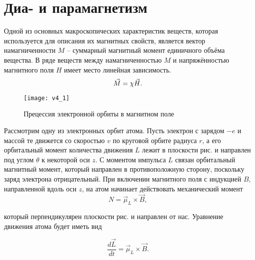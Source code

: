 \section{Диа- и парамагнетизм}

Одной из основных макроскопических характеристик веществ, которая используется для описания их магнитных свойств, является вектор намагниченности $M$ -- суммарный магнитный момент единичного объёма вещества. В ряде веществ между намагниченностью $M$ и напряжённостью магнитного поля $H$ имеет место линейная зависимость.
\begin{equation}
	\eqmark{magnetization-magnetic vector}
	\vec{M} = \chi\vec{H}.
\end{equation}

\begin{wrapfigure}[24]{r}{0.35\textwidth}
	\texttt{[image: v4\_1]}
	\caption{Прецессия электронной орбиты в магнитном поле}
\end{wrapfigure}

Рассмотрим одну из электронных орбит атома. Пусть электрон с зарядом $-e$ и массой те движется со скоростью $v$ по круговой орбите радиуса $r$, а его орбитальный момент количества движения $L$ лежит в плоскости рис.  и направлен под углом $\theta$ к некоторой оси $z$. С моментом импульса $L$ связан орбитальный магнитный момент, который направлен в противоположную сторону, поскольку заряд электрона отрицательный. При включении магнитного поля с индукцией $B$, направленной вдоль оси $z$, на атом начинает действовать механический момент
\begin{equation*}
	N = \vec{\mu}_L\times \vec{B},
\end{equation*}

который перпендикулярен плоскости рис.  и направлен от нас. Уравнение движения атома будет иметь вид

\begin{equation*}
	\frac{d\vec{L}}{dt} = \vec{\mu}_L\times \vec{B}.
\end{equation*}

